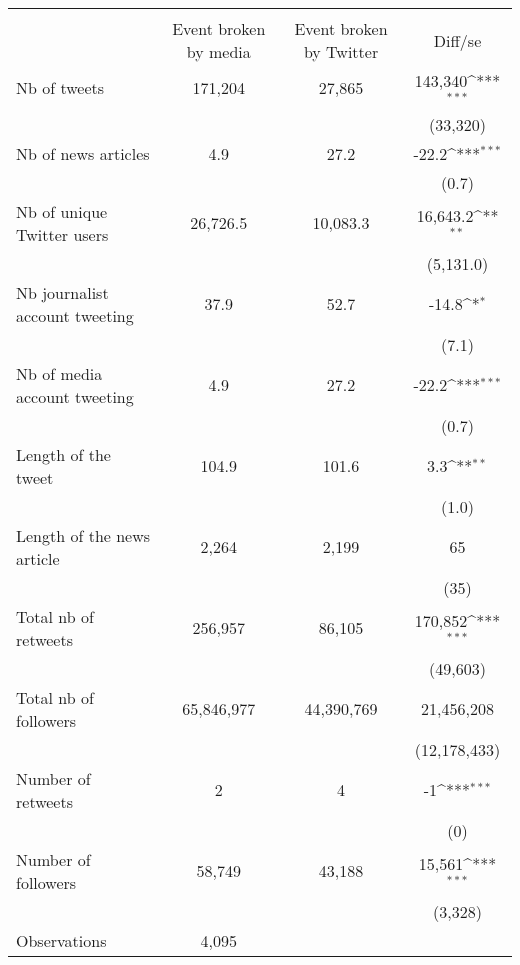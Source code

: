 {
\def\sym#1{\ifmmode^{#1}\else\(^{#1}\)\fi}
\begin{tabular}{l*{1}{ccc}}
\hline\hline
                    &\multicolumn{3}{c}{ }                          \\
                    &Event broken by media&Event broken by Twitter&     Diff/se         \\
\hline
Nb of tweets        &     171,204&      27,865&     143,340\sym{***}\\
                    &            &            &    (33,320)         \\
Nb of news articles &         4.9&        27.2&       -22.2\sym{***}\\
                    &            &            &       (0.7)         \\
Nb of unique Twitter users&    26,726.5&    10,083.3&    16,643.2\sym{**} \\
                    &            &            &   (5,131.0)         \\
Nb journalist account tweeting&        37.9&        52.7&       -14.8\sym{*}  \\
                    &            &            &       (7.1)         \\
Nb of media account tweeting&         4.9&        27.2&       -22.2\sym{***}\\
                    &            &            &       (0.7)         \\
Length of the tweet &       104.9&       101.6&         3.3\sym{**} \\
                    &            &            &       (1.0)         \\
Length of the news article&       2,264&       2,199&          65         \\
                    &            &            &        (35)         \\
Total nb of retweets&     256,957&      86,105&     170,852\sym{***}\\
                    &            &            &    (49,603)         \\
Total nb of followers&  65,846,977&  44,390,769&  21,456,208         \\
                    &            &            &(12,178,433)         \\
Number of retweets  &           2&           4&          -1\sym{***}\\
                    &            &            &         (0)         \\
Number of followers &      58,749&      43,188&      15,561\sym{***}\\
                    &            &            &     (3,328)         \\
\hline
Observations        &       4,095&            &                     \\
\hline\hline
\end{tabular}
}
